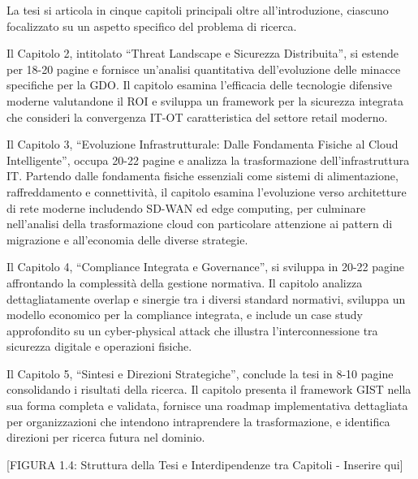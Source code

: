 \documentclass[12pt,a4paper,oneside]{book}
\begin{document}
La tesi si articola in cinque capitoli principali oltre
all'introduzione, ciascuno focalizzato su un aspetto specifico del
problema di ricerca.

Il Capitolo 2, intitolato ``Threat Landscape e Sicurezza Distribuita'',
si estende per 18-20 pagine e fornisce un'analisi quantitativa
dell'evoluzione delle minacce specifiche per la GDO. Il capitolo esamina
l'efficacia delle tecnologie difensive moderne valutandone il ROI e
sviluppa un framework per la sicurezza integrata che consideri la
convergenza IT-OT caratteristica del settore retail moderno.

Il Capitolo 3, ``Evoluzione Infrastrutturale: Dalle Fondamenta Fisiche
al Cloud Intelligente'', occupa 20-22 pagine e analizza la
trasformazione dell'infrastruttura IT. Partendo dalle fondamenta fisiche
essenziali come sistemi di alimentazione, raffreddamento e connettività,
il capitolo esamina l'evoluzione verso architetture di rete moderne
includendo SD-WAN ed edge computing, per culminare nell'analisi della
trasformazione cloud con particolare attenzione ai pattern di migrazione
e all'economia delle diverse strategie.

Il Capitolo 4, ``Compliance Integrata e Governance'', si sviluppa in
20-22 pagine affrontando la complessità della gestione normativa. Il
capitolo analizza dettagliatamente overlap e sinergie tra i diversi
standard normativi, sviluppa un modello economico per la compliance
integrata, e include un case study approfondito su un cyber-physical
attack che illustra l'interconnessione tra sicurezza digitale e
operazioni fisiche.

Il Capitolo 5, ``Sintesi e Direzioni Strategiche'', conclude la tesi in
8-10 pagine consolidando i risultati della ricerca. Il capitolo presenta
il framework GIST nella sua forma completa e validata, fornisce una
roadmap implementativa dettagliata per organizzazioni che intendono
intraprendere la trasformazione, e identifica direzioni per ricerca
futura nel dominio.

{[}FIGURA 1.4: Struttura della Tesi e Interdipendenze tra Capitoli -
Inserire qui{]}
\end{document}
